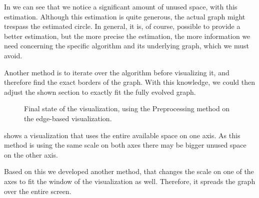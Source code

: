 \documentclass
[
    paper = a4,
    pagesize,
    12 pt,
    oneside,                       %
    open = right,
    DIV = calc,
    BCOR = 0 mm,                   %
    bibtotoc
]
{scrbook}
\begin{document}
In  we can see that we notice a significant amount of unused space, with this estimation.
Although this estimation is quite generous, the actual graph might trespass the estimated circle.
In general, it is, of course, possible to provide a better estimation, but the more precise the estimation, the more information we need concerning the specific algorithm and its underlying graph, which we must avoid.

Another method is to iterate over the algorithm before visualizing it, and therefore find the exact borders of the graph.
With this knowledge, we could then adjust the shown section to exactly fit the fully evolved graph.

\begin{figure}
\caption[]{Final state of the visualization, using the Preprocessing method on the edge-based visualization.}
\label{fig:preprocessing}
\end{figure}

 shows a visualization that uses the entire available space on one axis.
As this method is using the same scale on both axes there may be bigger unused space on the other axis.

Based on this we developed another method, that changes the scale on one of the axes to fit the window of the visualization as well.
Therefore, it spreads the graph over the entire screen.
\end{document}
